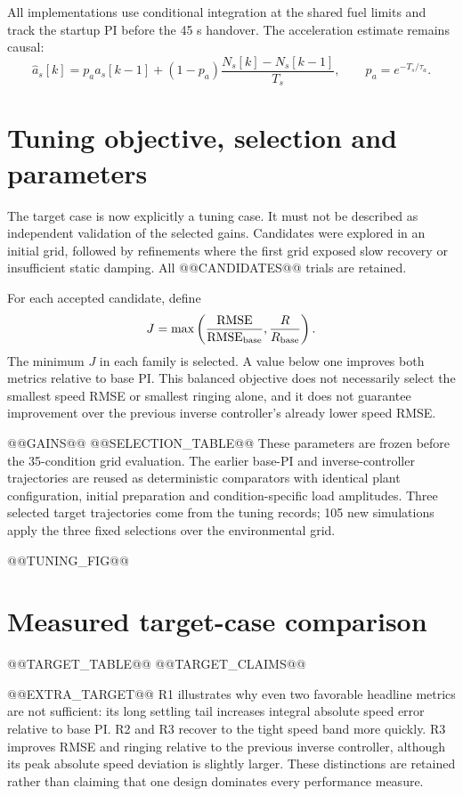 All implementations use conditional integration at the shared fuel limits and track the startup PI before the 45 s handover. The acceleration estimate remains causal:
\begin{equation}
\hat a_s[k]=p_a\hat a_s[k-1]+(1-p_a)\frac{N_s[k]-N_s[k-1]}{T_s},\qquad p_a=e^{-T_s/\tau_a}.
\end{equation}

\section{Tuning objective, selection and parameters}
The target case is now explicitly a tuning case. It must not be described as independent validation of the selected gains. Candidates were explored in an initial grid, followed by refinements where the first grid exposed slow recovery or insufficient static damping. All @@CANDIDATES@@ trials are retained.

For each accepted candidate, define
\begin{equation}
J=\max\left(\frac{\mathrm{RMSE}}{\mathrm{RMSE}_{\rm base}},\frac{R}{R_{\rm base}}\right).
\end{equation}
The minimum $J$ in each family is selected. A value below one improves both metrics relative to base PI. This balanced objective does not necessarily select the smallest speed RMSE or smallest ringing alone, and it does not guarantee improvement over the previous inverse controller's already lower speed RMSE.

@@GAINS@@
@@SELECTION_TABLE@@
These parameters are frozen before the 35-condition grid evaluation. The earlier base-PI and inverse-controller trajectories are reused as deterministic comparators with identical plant configuration, initial preparation and condition-specific load amplitudes. Three selected target trajectories come from the tuning records; 105 new simulations apply the three fixed selections over the environmental grid.

@@TUNING_FIG@@

\section{Measured target-case comparison}
@@TARGET_TABLE@@
@@TARGET_CLAIMS@@

@@EXTRA_TARGET@@
R1 illustrates why even two favorable headline metrics are not sufficient: its long settling tail increases integral absolute speed error relative to base PI. R2 and R3 recover to the tight speed band more quickly. R3 improves RMSE and ringing relative to the previous inverse controller, although its peak absolute speed deviation is slightly larger. These distinctions are retained rather than claiming that one design dominates every performance measure.

